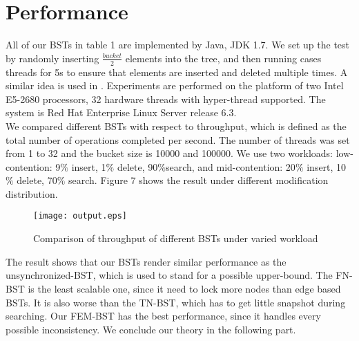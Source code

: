 \documentclass{article}
\begin{document}
\section{Performance}
All of our BSTs in table 1 are implemented by Java, JDK 1.7. We set up the test by randomly inserting $\frac{bucket}{2}$ elements into the tree, and then running cases threads for 5s to ensure that elements are inserted and deleted multiple times. A similar idea is used in \cite{alistarh2014spraylist}. 
Experiments are performed on the platform of two Intel E5-2680 processors, 32 hardware threads with hyper-thread supported. The system is Red Hat Enterprise Linux Server release 6.3.\\
We compared different BSTs with respect to throughput, which is defined as the total number of operations completed per second. The number of threads was set from 1 to 32 and the bucket size is 10000 and 100000. We use two workloads: low-contention: 9$\%$ insert, 1$\%$ delete, 90$\%$search, and mid-contention: 20$\%$ insert, 10$\%$ delete, 70$\%$ search.  Figure 7 shows the result under different modification distribution.
\begin{figure}[htbp]
\texttt{[image: output.eps]}
\caption{Comparison of throughput of different BSTs under varied workload}
\label{fig:my_label}
\end{figure}
The result shows that our BSTs render similar performance as the unsynchronized-BST, which is used to stand for a possible upper-bound. The FN-BST is the least scalable one, since it need to lock more nodes than edge based BSTs. It is also worse than the TN-BST, which has to get little snapshot during searching. Our FEM-BST has the best performance, since it handles every possible inconsistency. We conclude our theory in the following part. 
\end{document}
